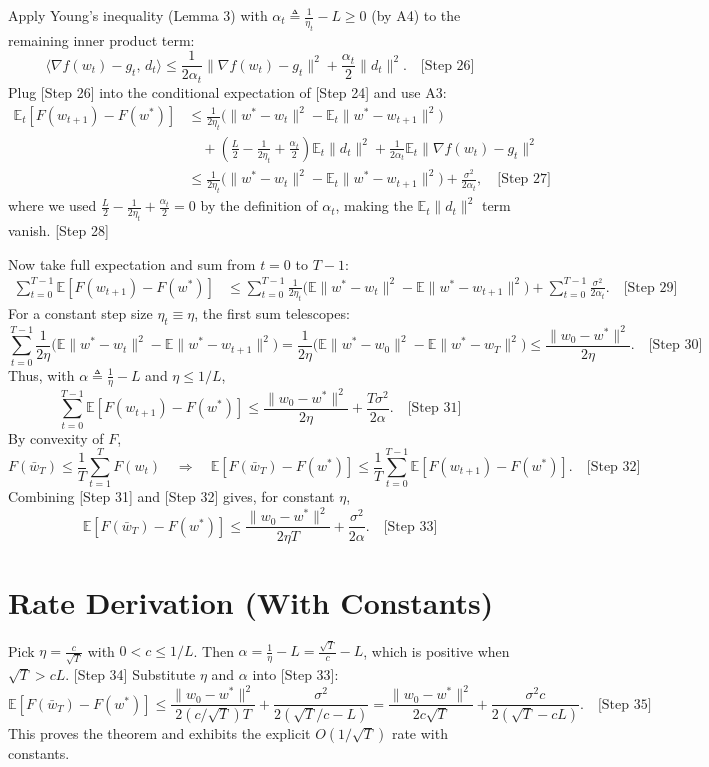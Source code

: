 \documentclass{article}
\newcommand{\E}{\mathbb{E}}
\begin{document}
Apply Young's inequality (Lemma 3) with $\alpha_t \triangleq \frac{1}{\eta_t} - L \ge 0$ (by A4) to the remaining inner product term:
\[
\langle \nabla f(w_t) - g_t,\, d_t\rangle \le \frac{1}{2\alpha_t}\|\nabla f(w_t) - g_t\|^2 + \frac{\alpha_t}{2}\|d_t\|^2. \quad \text{[Step 26]}
\]
Plug [Step 26] into the conditional expectation of [Step 24] and use A3:
\begin{align*}
\E_t\!\left[F(w_{t+1}) - F(w^*)\right]
&\le \frac{1}{2\eta_t}\Big(\|w^* - w_t\|^2 - \E_t\|w^* - w_{t+1}\|^2\Big) \\
&\quad + \left(\frac{L}{2} - \frac{1}{2\eta_t} + \frac{\alpha_t}{2}\right)\E_t\|d_t\|^2 + \frac{1}{2\alpha_t}\E_t\|\nabla f(w_t) - g_t\|^2 \\
&\le \frac{1}{2\eta_t}\Big(\|w^* - w_t\|^2 - \E_t\|w^* - w_{t+1}\|^2\Big) + \frac{\sigma^2}{2\alpha_t}, \quad \text{[Step 27]}
\end{align*}
where we used $\frac{L}{2} - \frac{1}{2\eta_t} + \frac{\alpha_t}{2} = 0$ by the definition of $\alpha_t$, making the $\E_t\|d_t\|^2$ term vanish. [Step 28]

Now take full expectation and sum from $t=0$ to $T-1$:
\begin{align*}
\sum_{t=0}^{T-1} \E\!\left[F(w_{t+1}) - F(w^*)\right]
&\le \sum_{t=0}^{T-1} \frac{1}{2\eta_t}\Big(\E\|w^* - w_t\|^2 - \E\|w^* - w_{t+1}\|^2\Big) + \sum_{t=0}^{T-1} \frac{\sigma^2}{2\alpha_t}. \quad \text{[Step 29]}
\end{align*}
For a constant step size $\eta_t \equiv \eta$, the first sum telescopes:
\[
\sum_{t=0}^{T-1} \frac{1}{2\eta}\Big(\E\|w^* - w_t\|^2 - \E\|w^* - w_{t+1}\|^2\Big) = \frac{1}{2\eta}\Big(\E\|w^* - w_0\|^2 - \E\|w^* - w_T\|^2\Big) \le \frac{\|w_0 - w^*\|^2}{2\eta}. \quad \text{[Step 30]}
\]
Thus, with $\alpha \triangleq \frac{1}{\eta} - L$ and $\eta \le 1/L$,
\[
\sum_{t=0}^{T-1} \E\!\left[F(w_{t+1}) - F(w^*)\right] \le \frac{\|w_0 - w^*\|^2}{2\eta} + \frac{T\sigma^2}{2\alpha}. \quad \text{[Step 31]}
\]
By convexity of $F$,
\[
F(\bar w_T) \le \frac{1}{T}\sum_{t=1}^T F(w_t) \quad \Rightarrow \quad \E\!\left[F(\bar w_T) - F(w^*)\right] \le \frac{1}{T}\sum_{t=0}^{T-1} \E\!\left[F(w_{t+1}) - F(w^*)\right]. \quad \text{[Step 32]}
\]
Combining [Step 31] and [Step 32] gives, for constant $\eta$,
\[
\E\!\left[F(\bar w_T) - F(w^*)\right] \le \frac{\|w_0 - w^*\|^2}{2\eta T} + \frac{\sigma^2}{2\alpha}. \quad \text{[Step 33]}
\]

\section*{Rate Derivation (With Constants)}
Pick $\eta = \frac{c}{\sqrt{T}}$ with $0 < c \le 1/L$. Then $\alpha = \frac{1}{\eta} - L = \frac{\sqrt{T}}{c} - L$, which is positive when $\sqrt{T} > cL$. [Step 34]
Substitute $\eta$ and $\alpha$ into [Step 33]:
\[
\E\!\left[F(\bar w_T) - F(w^*)\right] \le \frac{\|w_0 - w^*\|^2}{2(c/\sqrt{T})T} + \frac{\sigma^2}{2(\sqrt{T}/c - L)}
= \frac{\|w_0 - w^*\|^2}{2c\sqrt{T}} + \frac{\sigma^2 c}{2(\sqrt{T} - cL)}. \quad \text{[Step 35]}
\]
This proves the theorem and exhibits the explicit $O(1/\sqrt{T})$ rate with constants.
\end{document}
